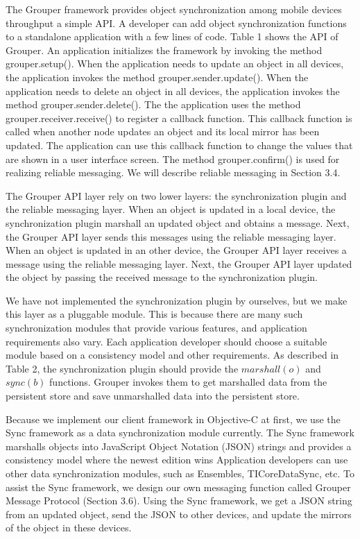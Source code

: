 \documentclass[twocolumn,10pt]{article}
\begin{document}
The Grouper framework provides object synchronization among mobile devices throughput a simple API.
A developer can add object synchronization functions to a standalone application with a few lines of code.
Table 1 shows the API of Grouper.
An application initializes the framework by invoking the method grouper.setup().
When the application needs to update an object in all devices, the application invokes the method grouper.sender.update().
When the application needs to delete an object in all devices, the application invokes the method grouper.sender.delete().
The the application uses the method grouper.receiver.receive() to register a callback function.
This callback function is called when another node updates an object and its local mirror has been updated.
The application can use this callback function to change the values that are shown in a user interface screen.
The method grouper.confirm() is used for realizing reliable messaging.
We will describe reliable messaging in Section 3.4.

The Grouper API layer rely on two lower layers: the synchronization plugin and the reliable messaging layer.
When an object is updated in a local device, the synchronization plugin marshall an updated object and obtains a message.
Next, the Grouper API layer sends this messages using the reliable messaging layer.
When an object is updated in an other device, the Grouper API layer receives a message using the reliable messaging layer.
Next, the Grouper API layer updated the object by passing the received message to the synchronization plugin.

We have not implemented the synchronization plugin by ourselves, but we make this layer as a pluggable module.
This is because there are many such synchronization modules that provide various features, and application requirements also vary.
Each application developer should choose a suitable module based on a consistency model and other requirements.
As described in Table 2, the synchronization plugin should provide the $marshall(o)$ and $sync(b)$ functions.
Grouper invokes them to get marshalled data from the persistent store and save unmarshalled data into the persistent store.

Because we implement our client framework in Objective-C at first, we use the Sync framework\cite{sync} as a data synchronization module currently.
The Sync framework marshalls objects into JavaScript Object Notation (JSON) strings and provides a consistency model where the newest edition wins
Application developers can use other data synchronization modules, such as Ensembles\cite{ensembles}, TICoreDataSync\cite{TICoreDataSync}, etc.
To assist the Sync framework, we design our own messaging function called Grouper Message Protocol (Section 3.6). 
Using the Sync framework, we get a JSON string from an updated object, send the JSON to other devices, and update the mirrors of the object in these devices.
\end{document}
